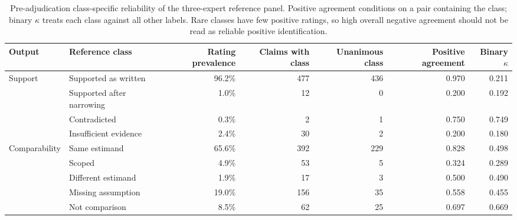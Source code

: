 \begin{table}[t]
\centering\scriptsize
\setlength{\tabcolsep}{4pt}
\begin{tabular}{llrrrrr}
\toprule
Output & Reference class & Rating prevalence & Claims with class & Unanimous class & Positive agreement & Binary $\kappa$ \\
\midrule
Support & Supported as written & 96.2\% & 477 & 436 & 0.970 & 0.211 \\
 & Supported after narrowing & 1.0\% & 12 & 0 & 0.200 & 0.192 \\
 & Contradicted & 0.3\% & 2 & 1 & 0.750 & 0.749 \\
 & Insufficient evidence & 2.4\% & 30 & 2 & 0.200 & 0.180 \\
\addlinespace
Comparability & Same estimand & 65.6\% & 392 & 229 & 0.828 & 0.498 \\
 & Scoped & 4.9\% & 53 & 5 & 0.324 & 0.289 \\
 & Different estimand & 1.9\% & 17 & 3 & 0.500 & 0.490 \\
 & Missing assumption & 19.0\% & 156 & 35 & 0.558 & 0.455 \\
 & Not comparison & 8.5\% & 62 & 25 & 0.697 & 0.669 \\
\bottomrule
\end{tabular}
\caption{Pre-adjudication class-specific reliability of the three-expert reference panel. Positive agreement conditions on a pair containing the class; binary $\kappa$ treats each class against all other labels. Rare classes have few positive ratings, so high overall negative agreement should not be read as reliable positive identification.}
\label{tab:v3-reference-class-reliability}
\end{table}
